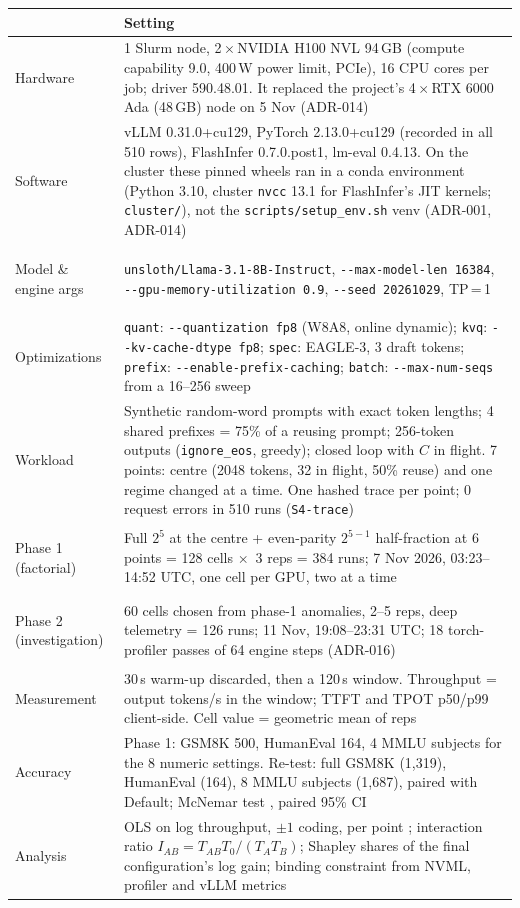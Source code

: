 \documentclass[10pt,a4paper]{article}
\newcommand{\hc}[1]{{\leavevmode\bfseries\color{ink}#1}}   %
\newcommand{\x}{\ensuremath{\times}}
\newcommand{\fp}[1]{{\leavevmode\urlstyle{tt}\color{codecol}\nolinkurl{#1}}}
\newcommand{\opt}[1]{\leavevmode\textcolor{codecol}{\texttt{#1}}}
\begin{document}
\begin{table}[H]
\small
{
\begin{tabularx}{\linewidth}{@{}>{\bfseries\raggedright\arraybackslash}p{3.2cm}L@{}}
\toprule
\rowcolor{tblhead}\hc{Item} & \hc{Setting} \\
\midrule
Hardware & 1 Slurm node, 2\,\x\,NVIDIA H100 NVL 94\,GB (compute capability 9.0, 400\,W power limit, PCIe), 16 CPU
cores per job; driver 590.48.01. It replaced the project's 4\,\x\,RTX 6000 Ada (48\,GB) node on 5 Nov (ADR-014) \\
Software & vLLM 0.31.0+cu129, PyTorch 2.13.0+cu129 (recorded in all 510 rows), FlashInfer 0.7.0.post1, lm-eval
0.4.13. On the cluster these pinned wheels ran in a conda environment (Python 3.10, cluster \texttt{nvcc} 13.1 for
FlashInfer's JIT kernels; \fp{cluster/}), not the \fp{scripts/setup_env.sh} venv (ADR-001, ADR-014) \\
Model \& engine args & \fp{unsloth/Llama-3.1-8B-Instruct}, \fp{--max-model-len 16384},
\fp{--gpu-memory-utilization 0.9}, \fp{--seed 20261029}, TP\,=\,1 \\
Optimizations & \opt{quant}: \fp{--quantization fp8} (W8A8, online dynamic); \opt{kvq}: \fp{--kv-cache-dtype fp8};
\opt{spec}: EAGLE-3, 3 draft tokens; \opt{prefix}: \fp{--enable-prefix-caching}; \opt{batch}:
\fp{--max-num-seqs} from a 16--256 sweep \\
Workload & Synthetic random-word prompts with exact token lengths; 4 shared prefixes = 75\% of a reusing prompt;
256-token outputs (\texttt{ignore\_eos}, greedy); closed loop with $C$ in flight. 7 points: centre (2048 tokens, 32
in flight, 50\% reuse) and one regime changed at a time. One hashed trace per point; 0 request errors in 510 runs
(\texttt{S4-trace}) \\
Phase 1 (factorial) & Full $2^5$ at the centre + even-parity $2^{5-1}$ half-fraction at 6 points = 128 cells \x\ 3
reps = 384 runs; 7 Nov 2026, 03:23--14:52 UTC, one cell per GPU, two at a time \\
Phase 2 (investigation) & 60 cells chosen from phase-1 anomalies, 2--5 reps, deep telemetry = 126 runs; 11 Nov,
19:08--23:31 UTC; 18 torch-profiler passes of 64 engine steps (ADR-016) \\
Measurement & 30\,s warm-up discarded, then a 120\,s window. Throughput = output tokens/s in the window; TTFT and
TPOT p50/p99 client-side. Cell value = geometric mean of reps \\
Accuracy & Phase 1: GSM8K 500, HumanEval 164, 4 MMLU subjects for the 8 numeric settings. Re-test: full GSM8K
(1,319), HumanEval (164), 8 MMLU subjects (1,687), paired with Default; McNemar test \cite{mcnemar}, paired 95\% CI \\
Analysis & OLS on log throughput, $\pm1$ coding, per point \cite{box}; interaction ratio
$I_{AB}=T_{AB}T_0/(T_AT_B)$; Shapley shares \cite{shapley} of the final configuration's log gain; binding constraint
from NVML, profiler and vLLM metrics \\
\bottomrule
\end{tabularx}}
\end{table}
\end{document}
